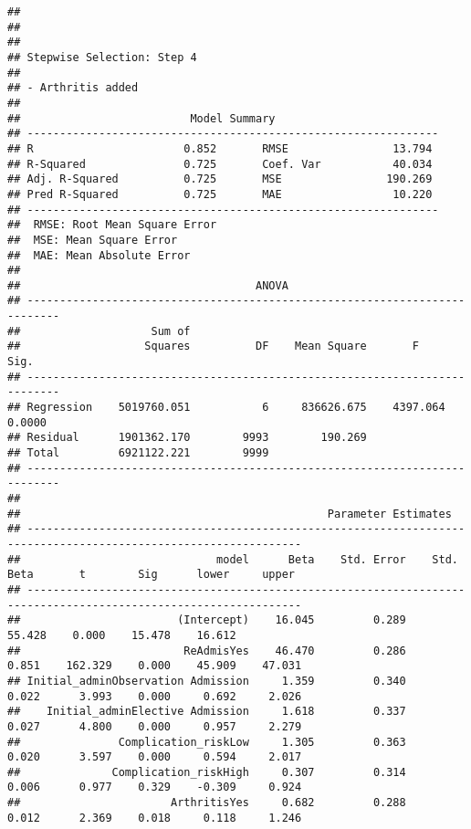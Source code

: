 \documentclass[
]{article}
\begin{document}
\begin{verbatim}
## 
## 
## 
## Stepwise Selection: Step 4 
## 
## - Arthritis added 
## 
##                          Model Summary                          
## ---------------------------------------------------------------
## R                       0.852       RMSE                13.794 
## R-Squared               0.725       Coef. Var           40.034 
## Adj. R-Squared          0.725       MSE                190.269 
## Pred R-Squared          0.725       MAE                 10.220 
## ---------------------------------------------------------------
##  RMSE: Root Mean Square Error 
##  MSE: Mean Square Error 
##  MAE: Mean Absolute Error 
## 
##                                    ANOVA                                    
## ---------------------------------------------------------------------------
##                    Sum of                                                  
##                   Squares          DF    Mean Square       F          Sig. 
## ---------------------------------------------------------------------------
## Regression    5019760.051           6     836626.675    4397.064    0.0000 
## Residual      1901362.170        9993        190.269                       
## Total         6921122.221        9999                                      
## ---------------------------------------------------------------------------
## 
##                                               Parameter Estimates                                                
## ----------------------------------------------------------------------------------------------------------------
##                              model      Beta    Std. Error    Std. Beta       t        Sig      lower     upper 
## ----------------------------------------------------------------------------------------------------------------
##                        (Intercept)    16.045         0.289                  55.428    0.000    15.478    16.612 
##                         ReAdmisYes    46.470         0.286        0.851    162.329    0.000    45.909    47.031 
## Initial_adminObservation Admission     1.359         0.340        0.022      3.993    0.000     0.692     2.026 
##    Initial_adminElective Admission     1.618         0.337        0.027      4.800    0.000     0.957     2.279 
##               Complication_riskLow     1.305         0.363        0.020      3.597    0.000     0.594     2.017 
##              Complication_riskHigh     0.307         0.314        0.006      0.977    0.329    -0.309     0.924 
##                       ArthritisYes     0.682         0.288        0.012      2.369    0.018     0.118     1.246 

\end{verbatim}
\end{document}
